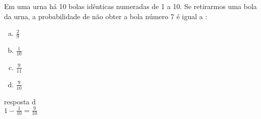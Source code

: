 \begin{ex}
 Em uma urna há 10 bolas idênticas numeradas de 1 a 10. Se retirarmos uma bola da urna, a probabilidade de não obter a bola número 7 é igual a :
    \begin{enumerate}[(a)]
    \item $\frac{2}{9}$
    \item $\frac{1}{10}$
    \item $\frac{9}{11}$
    \item $\frac{9}{10}$
    \end{enumerate}
    \begin{sol}
    resposta d \\
    $1-\frac{1}{10}=\frac{9}{10}$
    \end{sol}
\end{ex}